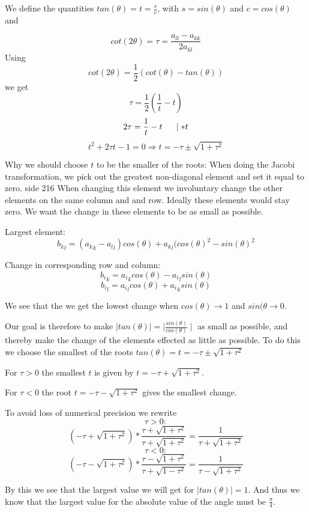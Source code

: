 \documentclass[a4paper,12pt, english]{article}
\begin{document}
We define the quantities $tan(\theta) = t = \frac{s}{c}$, with $s=sin(\theta)$ and $c = cos(\theta)$ and 

$$cot(2\theta) = \tau = \frac{a_{ll}- a_{kk}}{2a_{kl}} $$ 
Using $$cot(2\theta) = \frac{1}{2}(cot(\theta) - tan(\theta))$$ we get 
$$\tau = \frac{1}{2}(\frac{1}{t} -t) $$
$$2\tau = \frac{1}{t} - t \hspace{5mm} \mid *t $$
$$t^2 + 2\tau t - 1 = 0 \Rightarrow t = -\tau \pm \sqrt{1+\tau^2} $$


Why we should choose $t$ to be the smaller of the roots:
When doing the Jacobi transformation, we pick out the greatest non-diagonal element and set it equal to zero.
side 216
When changing this element we involuntary change the other elements on the same column and and row. Ideally these elements would stay zero. We want the change in these elements to be as small as possible. 

Largest element:
$$ {b_k}_l = ({a_k}_k - {a_l}_l) cos(\theta) + {a_k}_l(cos(\theta)^2 - sin(\theta)^2$$

Change in corresponding row and column:
$$ {b_i}_k = {a_i}_kcos(\theta) - {a_i}_lsin(\theta) $$
$$ {b_i}_l = {a_i}_lcos(\theta) + {a_i}_ksin(\theta) $$
  
We see that the we get the lowest change when $cos(\theta) \rightarrow 1$ and $sin(\theta \rightarrow 0$.

Our goal is therefore to make $ \mid tan(\theta) \mid  = \mid \frac{sin(\theta)}{cos(\theta)} \mid$ as small as possible, and thereby make the change of the elements effected as little as possible.
To do this we choose the smallest of the roots $tan(\theta) = t = - \tau \pm \sqrt{1+\tau^2}$

For $\tau > 0$ the smallest $t$ is given by $ t = - \tau + \sqrt{1+ \tau^2}$.

For $\tau < 0$ the root $ t = - \tau - \sqrt{1+ \tau^2}$ gives the smallest change.  
  
To avoid loss of numerical precision we rewrite
$$\tau>0:$$
$$(-\tau + \sqrt{1 + \tau^2}) * \frac{\tau + \sqrt{1+\tau^2}}{\tau + \sqrt{1+\tau^2}} = \frac{1}{\tau + \sqrt{1+\tau^2}} $$
$$\tau<0:$$
$$(-\tau - \sqrt{1 + \tau^2}) * \frac{\tau - \sqrt{1+\tau^2}}{\tau + \sqrt{1-\tau^2}} = \frac{1}{\tau - \sqrt{1+\tau^2}}$$

By this we see that the largest value we will get for $\mid tan(\theta) \mid = 1$. And thus we know that the largest value for the absolute value of the angle must be $\frac{\pi}{4}$. \\ 
  
\end{document}
